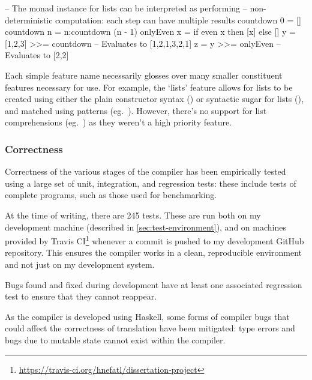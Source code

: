 \documentclass[dissertation.tex]{subfiles}
\begin{document}
{\begin{haskellfigure}
    -- The monad instance for lists can be interpreted as performing
    -- non-deterministic computation: each step can have multiple results
    countdown 0 = []
    countdown n = n:countdown (n - 1)
    onlyEven x = if even x then [x] else []
    y = [1,2,3] >>= countdown -- Evaluates to [1,2,1,3,2,1]
    z = y >>= onlyEven -- Evaluates to [2,2]
    \end{haskellfigure}

    Each simple feature name necessarily glosses over many smaller constituent features necessary for use. For example,
    the `lists' feature allows for lists to be created using either the plain constructor syntax
    () or syntactic sugar for lists (\haskell{[1,2,3]}), and matched using patterns (eg.\
    \haskell{[x,y] = [1,2]}). However, there's no support for list comprehensions (eg.\ \haskell{[f x | x <- [1,2,3],
    even x]}) as they weren't a high priority feature.


    
    \subsubsection{Correctness}
    {

        Correctness of the various stages of the compiler has been empirically tested using a large set of unit,
        integration, and regression tests: these include tests of complete programs, such as those used for
        benchmarking.
        
        At the time of writing, there are 245 tests. These are run both on my development machine
        (described in \ref{sec:test-environment}), and on machines provided by Travis
        CI\footnote{\url{https://travis-ci.org/hnefatl/dissertation-project}} whenever a commit is pushed to my
        development GitHub repository. This ensures the compiler works in a clean, reproducible environment and not just
        on my development system.

        Bugs found and fixed during development have at least one associated regression test to ensure that they cannot
        reappear.

        As the compiler is developed using Haskell, some forms of compiler bugs that could affect the correctness of
        translation have been mitigated: type errors and bugs due to mutable state cannot exist within the compiler.

    }
}
\end{document}
